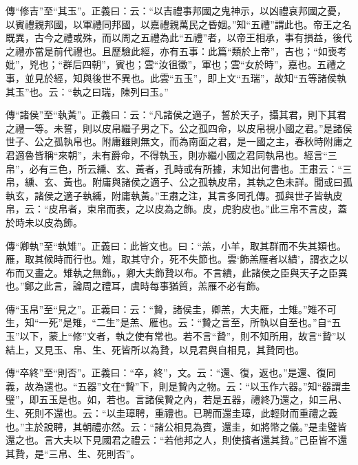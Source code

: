 {\noindent\zhuan{}\fzbyks 傳“修吉”至“其玉”。正義曰：云：“以吉禮事邦國之鬼神示，以凶禮哀邦國之憂，以賓禮親邦國，以軍禮同邦國，以嘉禮親萬民之昏姻。”知“五禮”謂此也。帝王之名既異，古今之禮或殊，而以周之五禮為此“五禮”者，以帝王相承，事有損益，後代之禮亦當是前代禮也。且歷驗此經，亦有五事：此篇“類於上帝”，吉也；“如喪考妣”，兇也；“群后四朝”，賓也；雲“汝徂徵”，軍也；雲“女於時”，嘉也。五禮之事，並見於經，知與後世不異也。此雲“五玉”，即上文“五瑞”，故知“五等諸侯執其玉”也。云：“執之曰瑞，陳列曰玉。” \par}

{\noindent\zhuan{}\fzbyks 傳“諸侯”至“執黃”。正義曰：云：“凡諸侯之適子，誓於天子，攝其君，則下其君之禮一等。未誓，則以皮帛繼子男之下。公之孤四命，以皮帛視小國之君。”是諸侯世子、公之孤執帛也。附庸雖則無文，而為南面之君，是一國之主，春秋時附庸之君適魯皆稱“來朝”，未有爵命，不得執玉，則亦繼小國之君同執帛也。經言“三帛”，必有三色，所云纁、玄、黃者，孔時或有所據，末知出何書也。王肅云：“三帛，纁、玄、黃也。附庸與諸侯之適子、公之孤執皮帛，其執之色未詳。聞或曰孤執玄，諸侯之適子執纁，附庸執黃。”王肅之注，其言多同孔傳。孤與世子皆執皮帛，云：“皮帛者，束帛而表，之以皮為之飾。皮，虎豹皮也。”此三帛不言皮，蓋於時未以皮為飾。 \par}

{\noindent\zhuan{}\fzbyks 傳“卿執”至“執雉”。正義曰：此皆文也。曰：“羔，小羊，取其群而不失其類也。雁，取其候時而行也。雉，取其守介，死不失節也。雲‘飾羔雁者以繢’，謂衣之以布而又畫之。雉執之無飾。，卿大夫飾贄以布。不言繢，此諸侯之臣與天子之臣異也。”鄭之此言，論周之禮耳，虞時每事猶質，羔雁不必有飾。 \par}

{\noindent\zhuan{}\fzbyks 傳“玉帛”至“見之”。正義曰：云：“贄，諸侯圭，卿羔，大夫雁，士雉。”雉不可生，知“一死”是雉，“二生”是羔、雁也。云：“贄之言至，所執以自至也。”自“五玉”以下，蒙上“修”文者，執之使有常也。若不言“贄”，則不知所用，故言“贄”以結上，又見玉、帛、生、死皆所以為贄，以見君與自相見，其贄同也。 \par}

{\noindent\zhuan{}\fzbyks 傳“卒終”至“則否”。正義曰：“卒，終”，文。云：“還、復，返也。”是還、復同義，故為還也。“五器”文在“贄”下，則是贄內之物。云：“以玉作六器。”知“器謂圭璧”，即五玉是也。如，若也。言諸侯贄之內，若是五器，禮終乃還之，如三帛、生、死則不還也。云：“以圭璋聘，重禮也。已聘而還圭璋，此輕財而重禮之義也。”主於說聘，其朝禮亦然。云：“諸公相見為賓，還圭，如將幣之儀。”是圭璧皆還之也。言大夫以下見國君之禮云：“若他邦之人，則使擯者還其贄。”己臣皆不還其贄，是“三帛、生、死則否”。 \par}

